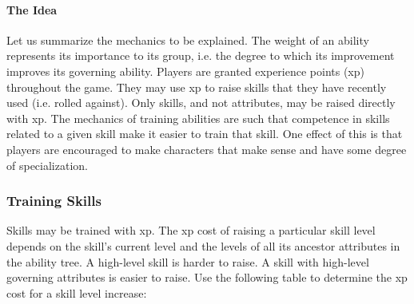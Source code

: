 \documentclass[12pt]{article}
\begin{document}
\paragraph{The Idea} Let us summarize the mechanics to be explained. The weight of an ability represents its importance to its group, i.e. the degree to which its improvement improves its governing ability.
Players are granted experience points (xp) throughout the game. They may use xp to raise skills that they have recently used (i.e. rolled against).
Only skills, and not attributes, may be raised directly with xp.
The mechanics of training abilities are such that competence in skills related to a given skill make it easier to train that skill.
One effect of this is that players are encouraged
to make characters that make sense and have some degree of specialization.


\subsubsection{Training Skills}\label{sec:skill}
Skills may be trained with xp.
The xp cost of raising a particular skill level depends on
the skill's current level and the levels of all its ancestor attributes in the ability tree.
A high-level skill is harder to raise.
A skill with high-level governing attributes is easier to raise.
Use the following table to determine the xp cost for a skill level increase:

\begin{center}
\resizebox{\columnwidth}{!}{

}
\end{center}
\end{document}
